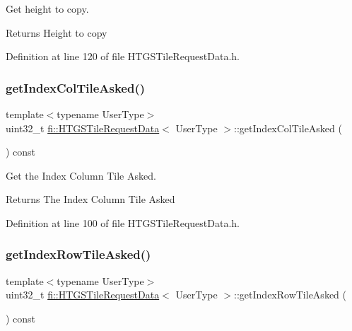 Get height to copy. 

\begin{DoxyReturn}{Returns}
Height to copy 
\end{DoxyReturn}


Definition at line 120 of file H\+T\+G\+S\+Tile\+Request\+Data.\+h.

\mbox{\label{classfi_1_1HTGSTileRequestData_a9ea23dda53b2ab8d0e4a8ec3b6f7ce1e}} 
\subsubsection{\texorpdfstring{get\+Index\+Col\+Tile\+Asked()}{getIndexColTileAsked()}}
{\footnotesize\ttfamily template$<$typename User\+Type$>$ \\
uint32\+\_\+t \hyperlink{classfi_1_1HTGSTileRequestData}{fi\+::\+H\+T\+G\+S\+Tile\+Request\+Data}$<$ User\+Type $>$\+::get\+Index\+Col\+Tile\+Asked (\begin{DoxyParamCaption}{ }\end{DoxyParamCaption}) const\hspace{0.3cm}{\ttfamily [inline]}}



Get the Index Column Tile Asked. 

\begin{DoxyReturn}{Returns}
The Index Column Tile Asked 
\end{DoxyReturn}


Definition at line 100 of file H\+T\+G\+S\+Tile\+Request\+Data.\+h.

\mbox{\label{classfi_1_1HTGSTileRequestData_a17f55de4d9db4ba83ec77c4d2d93f740}} 
\subsubsection{\texorpdfstring{get\+Index\+Row\+Tile\+Asked()}{getIndexRowTileAsked()}}
{\footnotesize\ttfamily template$<$typename User\+Type$>$ \\
uint32\+\_\+t \hyperlink{classfi_1_1HTGSTileRequestData}{fi\+::\+H\+T\+G\+S\+Tile\+Request\+Data}$<$ User\+Type $>$\+::get\+Index\+Row\+Tile\+Asked (\begin{DoxyParamCaption}{ }\end{DoxyParamCaption}) const\hspace{0.3cm}{\ttfamily [inline]}}



